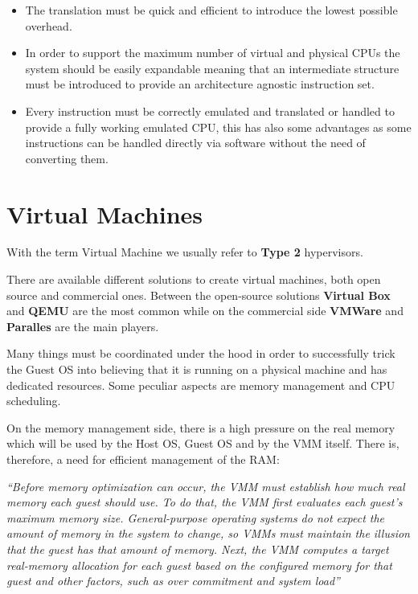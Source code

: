 \begin{itemize}
    \item The translation must be quick and efficient to introduce the lowest possible overhead.
    \item In order to support the maximum number of virtual and physical CPUs the system should be easily expandable meaning that an intermediate structure must be introduced to provide an architecture agnostic instruction set.
    \item Every instruction must be correctly emulated and translated or handled to provide a fully working emulated CPU, this has also some advantages as some instructions can be handled directly via software without the need of converting them.
\end{itemize}

\section{Virtual Machines}

With the term Virtual Machine we usually refer to \textbf{Type 2} hypervisors.

There are available different solutions to create virtual machines, both open source and commercial ones. Between the open-source solutions \textbf{Virtual Box} and \textbf{QEMU} are the most common while on the commercial side \textbf{VMWare} and \textbf{Paralles} are the main players. 

Many things must be coordinated under the hood in order to successfully trick the Guest OS into believing that it is running on a physical machine and has dedicated resources. Some peculiar aspects are memory management and CPU scheduling.

On the memory management side, there is a high pressure on the real memory which will be used by the Host OS, Guest OS and by the VMM itself. There is, therefore, a need for efficient management of the RAM:

\textit{``Before memory optimization can occur, the VMM must establish how much real memory each guest should use. To do that, the VMM first evaluates each guest’s maximum memory size. General-purpose operating systems do not expect the amount of memory in the system to change, so VMMs must maintain the illusion that the guest has that amount of memory. Next, the VMM computes a target real-memory allocation for each guest based on the configured memory for that guest and other factors, such as over commitment and system load''}~\cite{os}

